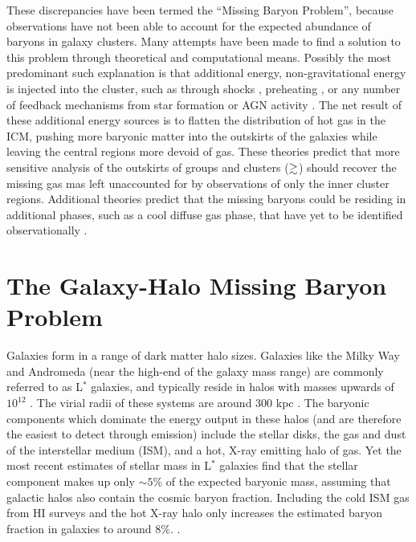 These discrepancies have been termed the ``Missing Baryon Problem'',
because observations have not been able to account for the expected
abundance of baryons in galaxy clusters. Many attempts have been made
to find a solution to this problem through theoretical and
computational means. Possibly the most predominant such explanation is
that additional energy, non-gravitational energy is injected into the
cluster, such as through shocks \citep{Takizawa1998}, preheating
\citep{Bialek2001}, or any number of feedback mechanisms from star
formation or AGN activity \citep{Metzler1994, McCarthy2007,
  Bode2009}. The net result of these additional energy sources is to
flatten the distribution of hot gas in the ICM, pushing more
baryonic matter into the outskirts of the galaxies while leaving the
central regions more devoid of gas. These theories predict that more
sensitive analysis of the outskirts of groups and clusters
($\gtrsim$\rvir{}) should recover the missing gas mas left unaccounted
for by observations of only the inner cluster regions. Additional
theories predict that the missing baryons could be residing in
additional phases, such as a cool diffuse gas phase, that have yet to
be identified observationally \citep{Afshordi2007, Bonamente2005}. 



\section{The Galaxy-Halo Missing Baryon Problem}
\label{sec:Missing.Galaxies}


Galaxies form in a range of dark matter halo sizes. Galaxies like the
Milky Way and Andromeda (near the high-end of the galaxy mass range)
are commonly referred to as L$^*$ galaxies, and typically reside in
halos with masses upwards of $10^{12}$ \Msun{}
\citep{Moster2010}. The virial radii of these systems are around 300
kpc \citep{Werk2014}. The baryonic components which dominate the energy output in these
halos (and are therefore the easiest to detect through emission)
include the stellar disks, the gas and dust of the interstellar medium
(ISM), and a hot, X-ray emitting halo of gas. Yet the most recent
estimates of stellar mass in L$^*$ galaxies \citep{Behroozi2010} find
that the stellar component makes up only $\sim5\%$ of the expected
baryonic mass, assuming that galactic halos also contain the cosmic
baryon fraction. Including the cold ISM gas from HI surveys and the
hot X-ray halo \citep[][respectively]{Martin2010, Gupta2012} only
increases the estimated baryon fraction in galaxies to around
$8\%$. .

